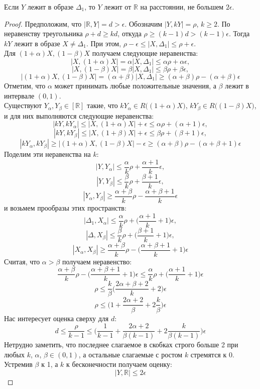 \begin{lemma}
	Если $Y$ лежит в образе $\Delta_1$, то $Y$ лежит от $\mathbb{R} $ на расстоянии, не большем $2\epsilon$.
\end{lemma}
\begin{proof}
	Предположим, что $|\mathbb{R}, Y| = d > \epsilon$.
	Обозначим $|Y, kY| = \rho$, $k \ge 2$. По неравенству треугольника $\rho + d \ge kd$, откуда $\rho \ge (k-1)d > (k-1)\epsilon$. Тогда $kY$ лежит в образе $X \ne \Delta_1$. При этом, $\rho - \epsilon \le |X, \Delta_1| \le \rho + \epsilon$. \\
	Для $(1+\alpha)X, (1-\beta)X$ получаем следующие неравенства:
	$$|X, (1+\alpha)X| = \alpha |X, \Delta_1| \le \alpha\rho + \alpha\epsilon,$$ 
	$$|X, (1-\beta)X| = \beta|X, \Delta_1| \le \beta\rho + \beta\epsilon,$$ 
	$$|(1+\alpha) X, (1-\beta)X| = (\alpha + \beta)|X, \Delta_1| \ge (\alpha+\beta)\rho - (\alpha+\beta)\epsilon$$ 
	Отметим, что $\alpha$ может принимать любые положительные значения, а $\beta$ лежит в интервале $(0, 1)$.\\
	Существуют $Y_\alpha, Y_\beta \in [\mathbb{R}]$ такие, что $kY_\alpha \in R\big((1+\alpha)X\big)$, $kY_\beta \in R\big((1-\beta)X\big)$, и для них выполняются следующие неравенства:
	$$|kY, kY_\alpha| \le |X, (1+\alpha)X| + \epsilon \le \alpha\rho + (\alpha+1)\epsilon,$$ 
	$$|kY, kY_\beta| \le |X, (1+\beta)X| + \epsilon \le \beta\rho + (\beta+1)\epsilon,$$
	$$|kY_\alpha, kY_\beta| \ge |(1+\alpha)X, (1-\beta)X| - \epsilon \ge  (\alpha+\beta)\rho - (\alpha+\beta+1)\epsilon$$
	\newpage
	\noindent Поделим эти неравенства на $k$:
	$$|Y, Y_{\alpha}| \le \frac{\alpha}{k}\rho + \frac{\alpha+1}{k}\epsilon,$$ 
	$$|Y, Y_{\beta}| \le \frac{\beta}{k}\rho + \frac{\beta+1}{k}\epsilon,$$
	$$|Y_\alpha, Y_{\beta}| \ge \frac{\alpha+\beta}{k}\rho - \frac{\alpha+\beta+1}{k}\epsilon$$ 
	и возьмем прообразы этих пространств:
	$$|\Delta_1, X_{\alpha}| \le \frac{\alpha}{k}\rho + \big(\frac{\alpha+1}{k} + 1\big)\epsilon,$$ 
	$$|\Delta, X_{\beta}| \le \frac{\beta}{k}\rho + \big(\frac{\beta+1}{k}+1\big)\epsilon,$$ 
	$$|X_\alpha, X_{\beta}| \ge \frac{\alpha+\beta}{k}\rho - \big(\frac{\alpha+\beta+1}{k}+1\big)\epsilon$$ 
	 Считая, что $\alpha > \beta$ получаем неравенство:
	 $$\frac{\alpha+\beta}{k}\rho - \big(\frac{\alpha+\beta+1}{k}+1\big)\epsilon \le \frac{\alpha}{k}\rho + \big(\frac{\alpha+1}{k} + 1\big)\epsilon$$
	 $$\rho \le \frac{k}{\beta}\bigg(\frac{2\alpha+\beta+2}{k}+2\bigg)\epsilon$$
	 $$\rho \le \bigg(1+\frac{2\alpha + 2}{\beta} + 2\frac{k}{\beta}\bigg)\epsilon$$
	Нас интересует оценка сверху для $d$:
	$$d \le \frac{\rho}{k-1} \le \bigg(\frac{1}{k-1}+\frac{2\alpha + 2}{\beta(k-1)} + 2\frac{k}{\beta(k-1)}\bigg)\epsilon $$
	Нетрудно заметить, что последнее слагаемое в скобках строго больше 2 при любых $k$, $\alpha$, $\beta\in (0,1)$, а остальные слагаемые с ростом $k$ стремятся к $0$. Устремив $\beta$ к 1, а $k$ к бесконечности получаем оценку:
	$$|Y, \mathbb{R}| \le 2\epsilon$$
\end{proof}

